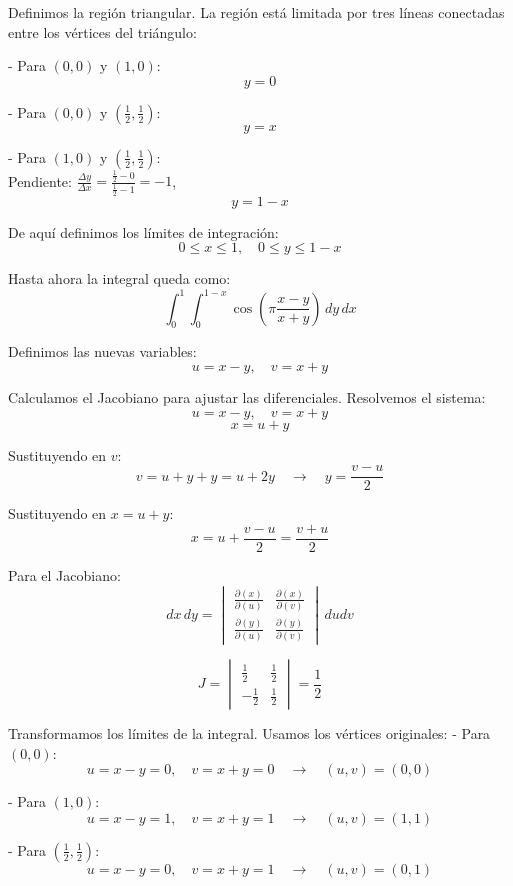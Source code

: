 Definimos la región triangular. La región está limitada por tres líneas conectadas entre los vértices del triángulo:

- Para \((0,0)\) y \((1,0)\):
  \[
  y = 0
  \]

- Para \((0,0)\) y \(\left(\frac{1}{2},\frac{1}{2}\right)\):
  \[
  y = x
  \]

- Para \((1,0)\) y \(\left(\frac{1}{2},\frac{1}{2}\right)\):\\
  Pendiente: \(\frac{\Delta y}{\Delta x} = \frac{\frac{1}{2}-0}{\frac{1}{2}-1} = -1\),
  \[
  y = 1 - x
  \]

De aquí definimos los límites de integración:
\[
0 \leq x \leq 1, \quad 0 \leq y \leq 1-x
\]

Hasta ahora la integral queda como:
\[
\int_0^1 \int_0^{1-x} \cos\left(\pi \frac{x-y}{x+y}\right) \, dy \, dx
\]

Definimos las nuevas variables:
\[
u = x - y, \quad v = x + y
\]

Calculamos el Jacobiano para ajustar las diferenciales. Resolvemos el sistema:
\[
u = x - y, \quad v = x + y
\]
\[
x = u + y
\]

Sustituyendo en \(v\):
\[
v = u + y + y = u + 2y \quad \rightarrow \quad y = \frac{v - u}{2}
\]

Sustituyendo en \(x = u + y\):
\[
x = u + \frac{v - u}{2} = \frac{v + u}{2}
\]

Para el Jacobiano:
\[
dx \, dy = 
\begin{vmatrix}
\frac{\partial(x)}{\partial(u)} & \frac{\partial(x)}{\partial(v)}\\
\frac{\partial(y)}{\partial(u)} & \frac{\partial(y)}{\partial(v)}
\end{vmatrix}
\, dudv
\]

\[
J =
\begin{vmatrix}
\frac{1}{2} & \frac{1}{2}\\
-\frac{1}{2} & \frac{1}{2}
\end{vmatrix}
= \frac{1}{2}
\]

Transformamos los límites de la integral. Usamos los vértices originales:
- Para \((0,0)\):
  \[
  u = x - y = 0, \quad v = x + y = 0 \quad \rightarrow \quad (u, v) = (0, 0)
  \]

- Para \((1,0)\):
  \[
  u = x - y = 1, \quad v = x + y = 1 \quad \rightarrow \quad (u, v) = (1, 1)
  \]

- Para \(\left(\frac{1}{2}, \frac{1}{2}\right)\):
  \[
  u = x - y = 0, \quad v = x + y = 1 \quad \rightarrow \quad (u, v) = (0, 1)
  \]

